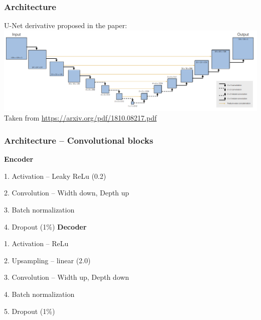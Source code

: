 \begin{frame}
    \frametitle{Architecture}

U-Net derivative proposed in the paper: \\[\baselineskip]

\includegraphics[width=\textwidth, height=.55\textheight]{./Ressourcen/Praesentation/Bilder/architecture.png}%
\newline
Taken from \url{https://arxiv.org/pdf/1810.08217.pdf}
\end{frame}
\clearpage

\begin{frame}
    \frametitle{Architecture -- Convolutional blocks}
\vspace*{1cm}
\begin{multicols}{2}
    \textbf{Encoder}

    1. Activation -- Leaky ReLu (0.2)

    2. Convolution -- Width down, Depth up

    3. Batch normalization

    4. Dropout (1\%)
    \vfill\columnbreak
    \textbf{Decoder}
    
    1. Activation -- ReLu
    
    2. Upsampling -- linear (2.0)

    3. Convolution -- Width up, Depth down

    4. Batch normalization

    5. Dropout (1\%)
    
\end{multicols}
    
\end{frame}
\clearpage

